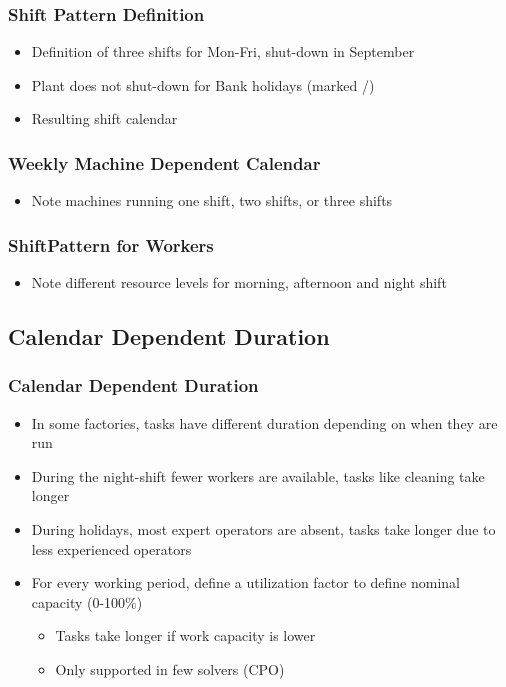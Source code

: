 \begin{frame}
\frametitle{Shift Pattern Definition \navail}
\scalebox{0.45}{

}
\begin{itemize}
\item Definition of three shifts for Mon-Fri, shut-down in September
\item Plant does not shut-down for Bank holidays (marked /)
\end{itemize}

\scalebox{0.4}{

}
\begin{itemize}
\item Resulting shift calendar
\end{itemize}

\end{frame}

\begin{frame}
\frametitle{Weekly Machine Dependent Calendar}
\scalebox{0.4}{

}
\begin{itemize}
\item Note machines running one shift, two shifts, or three shifts
\end{itemize}

\end{frame}

\begin{frame}
\frametitle{ShiftPattern for Workers}
\scalebox{0.45}{

}

\begin{itemize}
\item Note different resource levels for morning, afternoon and night shift
\end{itemize}

\end{frame}

\subsection{Calendar Dependent Duration}

\begin{frame}
\frametitle{Calendar Dependent Duration \navail}
\begin{itemize}
\item In some factories, tasks have different duration depending on when they are run
\item During the night-shift fewer workers are available, tasks like cleaning take longer
\item During holidays, most expert operators are absent, tasks take longer due to less experienced operators
\item For every working period, define a utilization factor to define nominal capacity (0-100\%)
\begin{itemize}
\item Tasks take longer if work capacity is lower
\item Only supported in few solvers (CPO)
\end{itemize}

\end{itemize}
\end{frame}


